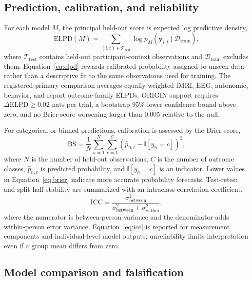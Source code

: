 \documentclass[conference]{IEEEtran}
\begin{document}
\subsection{Prediction, calibration, and reliability}

For each model $M$, the principal held-out score is expected log predictive density,
\begin{equation}
\mathrm{ELPD}(M)=\sum_{(i,t)\in\mathcal{T}_{\mathrm{test}}}\log p_M\!\left(\mathbf{y}_{i,t}\mid\mathcal{D}_{\mathrm{train}}\right),
\label{eq:elpd}
\end{equation}
where $\mathcal{T}_{\mathrm{test}}$ contains held-out participant-context observations and $\mathcal{D}_{\mathrm{train}}$ excludes them. Equation~\eqref{eq:elpd} rewards calibrated probability assigned to unseen data rather than a descriptive fit to the same observations used for training. The registered primary comparison averages equally weighted fMRI, EEG, autonomic, behavior, and report outcome-family ELPDs. ORIGIN support requires $\Delta\mathrm{ELPD}\geq 0.02$ nats per trial, a bootstrap 95\% lower confidence bound above zero, and no Brier-score worsening larger than 0.005 relative to the null.

For categorical or binned predictions, calibration is assessed by the Brier score,
\begin{equation}
\mathrm{BS}=\frac{1}{N}\sum_{n=1}^{N}\sum_{c=1}^{C}\left(\widehat{p}_{n,c}-\mathbb{I}[y_n=c]\right)^2,
\label{eq:brier}
\end{equation}
where $N$ is the number of held-out observations, $C$ is the number of outcome classes, $\widehat{p}_{n,c}$ is predicted probability, and $\mathbb{I}[y_n=c]$ is an indicator. Lower values in Equation~\eqref{eq:brier} indicate more accurate probability forecasts. Test-retest and split-half stability are summarized with an intraclass correlation coefficient,
\begin{equation}
\mathrm{ICC}=\frac{\sigma^{2}_{\mathrm{between}}}{\sigma^{2}_{\mathrm{between}}+\sigma^{2}_{\mathrm{within}}},
\label{eq:icc}
\end{equation}
where the numerator is between-person variance and the denominator adds within-person error variance. Equation~\eqref{eq:icc} is reported for measurement components and individual-level model outputs; unreliability limits interpretation even if a group mean differs from zero.

\subsection{Model comparison and falsification}
\end{document}
